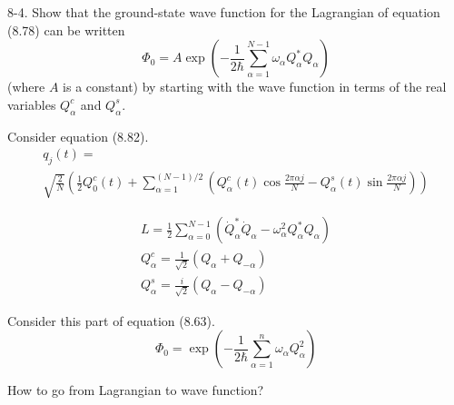 \documentclass[12pt]{article}
\begin{document}
8-4.
Show that the ground-state wave function for the Lagrangian of
equation (8.78) can be written
\begin{equation*}
\Phi_0=A\exp\left(
-\frac{1}{2\hbar}
\sum_{\alpha=1}^{N-1}
\omega_\alpha Q_\alpha^*Q_\alpha
\right)
\tag{8.83}
\end{equation*}
(where $A$ is a constant) by starting with the wave function in terms of
the real variables $Q_\alpha^c$ and $Q_\alpha^s$.

\bigskip
Consider equation (8.82).
\begin{multline*}
q_j(t)=
\\
\sqrt{\frac{2}{N}}\left(
\frac{1}{2}Q_0^c(t)
+\sum_{\alpha=1}^{(N-1)/2}
\left(
Q_\alpha^c(t)\cos\frac{2\pi\alpha j}{N}
-Q_\alpha^s(t)\sin\frac{2\pi\alpha j}{N}
\right)
\right)
\tag{8.82}
\end{multline*}



\begin{gather*}
L=\frac{1}{2}\sum_{\alpha=0}^{N-1}
\left(\dot Q_\alpha^*\dot Q_\alpha-\omega_\alpha^2Q_\alpha^*Q_\alpha\right)
\tag{8.78}
\\
Q_\alpha^c=\frac{1}{\sqrt2}(Q_\alpha+Q_{-\alpha})
\tag{8.79}
\\
Q_\alpha^s=\frac{i}{\sqrt2}(Q_\alpha-Q_{-\alpha})
\tag{8.80}
\end{gather*}

Consider this part of equation (8.63).
\begin{equation*}
\Phi_0=\exp\left(
-\frac{1}{2\hbar}\sum_{\alpha=1}^n\omega_\alpha Q_\alpha^2
\right)
\tag{8.63}
\end{equation*}

How to go from Lagrangian to wave function?
\end{document}

